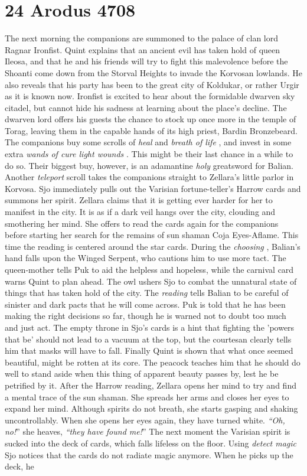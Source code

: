 \section{24 Arodus 4708}

The next morning the companions are summoned to the palace of clan lord Ragnar Ironfist. Quint explains that an ancient evil has taken hold of queen Ileosa, and that he and his friends will try to fight this malevolence before the Shoanti come down from the Storval Heights to invade the Korvosan lowlands. He also reveals that his party has been to the great city of Koldukar, or rather Urgir as it is known now. Ironfist is excited to hear about the formidable dwarven sky citadel, but cannot hide his sadness at learning about the place's decline. The dwarven lord offers his guests the chance to stock up once more in the temple of Torag, leaving them in the capable hands of its high priest, Bardin Bronzebeard. The companions buy some scrolls of {\itshape heal} and  {\itshape breath of life} , and invest in some extra  {\itshape wands of cure light wounds} . This might be their last chance in a while to do so. Their biggest buy, however, is an adamantine  {\itshape holy} greatsword for Balian. Another {\itshape teleport} scroll takes the companions straight to Zellara's little parlor in Korvosa. Sjo immediately pulls out the Varisian fortune-teller's Harrow cards and summons her spirit. Zellara claims that it is getting ever harder for her to manifest in the city. It is as if a dark veil hangs over the city, clouding and smothering her mind. She offers to read the cards again for the companions before starting her search for the remains of sun shaman Coja Eyes-Aflame. This time the reading is centered around the star cards. During the  {\itshape choosing} , Balian's hand falls upon the Winged Serpent, who cautions him to use more tact. The queen-mother tells Puk to aid the helpless and hopeless, while the carnival card warns Quint to plan ahead. The owl ushers Sjo to combat the unnatural state of things that has taken hold of the city. The {\itshape reading} tells Balian to be careful of sinister and dark pacts that he will come across. Puk is told that he has been making the right decisions so far, though he is warned not to doubt too much and just act. The empty throne in Sjo's cards is a hint that fighting the 'powers that be' should not lead to a vacuum at the top, but the courtesan clearly tells him that masks will have to fall. Finally Quint is shown that what once seemed beautiful, might be rotten at its core. The peacock teaches him that he should do well to stand aside when this thing of apparent beauty passes by, lest he be petrified by it. After the Harrow reading, Zellara opens her mind to try and find a mental trace of the sun shaman. She spreads her arms and closes her eyes to expand her mind. Although spirits do not breath, she starts gasping and shaking uncontrollably. When she opens her eyes again, they have turned white. {\itshape``Oh, no!}'' she heaves, {\itshape``they have found me!}'' The next moment the Varisian spirit is sucked into the deck of cards, which falls lifeless on the floor. Using {\itshape detect magic} Sjo notices that the cards do not radiate magic anymore. When he picks up the deck, he 